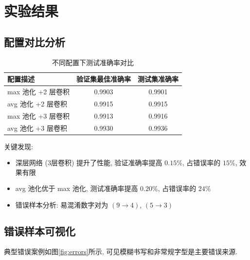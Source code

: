 \documentclass{article}
\begin{document}
	\section{实验结果}
		\subsection{配置对比分析}
			\begin{table}[htbp]
				\centering
				\caption{不同配置下测试准确率对比}
				\begin{tabular}{lcc}
					\toprule
					配置描述 & 验证集最佳准确率 & 测试集准确率 \\
					\midrule
					max 池化 +2 层卷积 & 0.9903 & 0.9901 \\
					avg 池化 +2 层卷积 & 0.9915 & 0.9915 \\
					max 池化 +3 层卷积 & 0.9913 & 0.9916 \\
					avg 池化 +3 层卷积 & 0.9930 & 0.9936 \\
					\bottomrule
				\end{tabular}
			\end{table}

			关键发现:
				\begin{itemize}
					\item 深层网络 (3层卷积) 提升了性能, 验证准确率提高 $0.15\%$, 占错误率的 $15\%$, 效果有限
					\item avg 池化优于 max 池化, 测试准确率提高 $0.20\%$, 占错误率的 $24\%$
					\item 错误样本分析: 易混淆数字对为 $(9 \to 4)$, $(5 \to 3)$
				\end{itemize}

		\subsection{错误样本可视化}
			典型错误案例如图\ref{fig:errors}所示, 可见模糊书写和非常规字型是主要错误来源.
\end{document}
